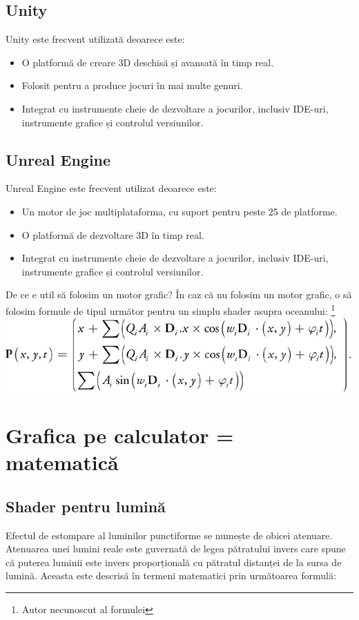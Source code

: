 \documentclass[12pt]{article}
\begin{document}
\subsection{Unity}
Unity este frecvent utilizată deoarece este:
\begin{itemize}
\item O platformă de creare 3D deschisă și avansată în timp real.
\item Folosit pentru a produce jocuri în mai multe genuri.
\item Integrat cu instrumente cheie de dezvoltare a jocurilor, inclusiv IDE-uri, instrumente grafice și controlul versiunilor.
\end{itemize}

\subsection{Unreal Engine}
Unreal Engine este frecvent utilizat deoarece este:
\begin{itemize}
\item Un motor de joc multiplataforma, cu suport pentru peste 25 de platforme.
\item O platformă de dezvoltare 3D în timp real.
\item Integrat cu instrumente cheie de dezvoltare a jocurilor, inclusiv IDE-uri, instrumente grafice și controlul versiunilor.
\end{itemize}

De ce e util să folosim un motor grafic?
În caz că nu folosim un motor grafic, o să folosim formule de tipul următor pentru un simplu shader asupra oceanului: \footnote[3]{Autor necunoscut al formulei} \\
 \includegraphics[width=\linewidth]{water.jpg}

\newpage
\section{Grafica pe calculator = matematică}
\subsection{Shader pentru lumină}
Efectul de estompare al luminilor punctiforme se numește de obicei atenuare. Atenuarea unei lumini reale este guvernată de legea pătratului invers care spune că puterea luminii este invers proporțională cu pătratul distanței de la sursa de lumină. Aceasta este descrisă în termeni matematici prin următoarea formulă:
\end{document}
